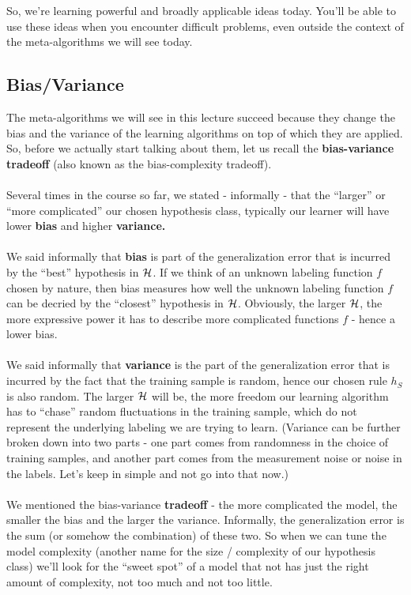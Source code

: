 %
So, we're learning powerful
and broadly applicable ideas today.
 You'll be able to use these ideas when you
encounter difficult problems, even outside the context of the meta-algorithms we
will see today.

\subsection{Bias/Variance}

The meta-algorithms we will see in this lecture succeed because they change the
bias and the variance of the learning algorithms on top of which they are
applied. 
So, before we actually start talking about them, let us recall the {\bf bias-variance tradeoff} (also known as
the bias-complexity tradeoff). 
\\~\\
Several times in the course so far, we stated - informally - that the ``larger''
or ``more complicated'' our chosen hypothesis class, typically 
our learner will have lower
{\bf bias}
 and higher {\bf variance.}
\\~\\
 We said informally that {\bf bias} is part of the generalization error that is 
 incurred by the ``best'' hypothesis in $\mathcal{H}$. If
 we think of an unknown labeling function $f$ chosen by nature, 
 then bias measures how well the unknown labeling function $f$ can be decried by the
 ``closest'' hypothesis in $\mathcal{H}$. Obviously, the larger $\mathcal{H}$, the more
 expressive power it has to describe more complicated functions $f$ - hence a
 lower bias.
\\~\\
 We said informally that {\bf variance} is the part of the generalization error that is
 incurred by the fact that the training sample is random, hence our chosen rule
 $h_S$ is also random. The larger $\mathcal{H}$ will be, the more freedom our learning
 algorithm has to ``chase'' random fluctuations in the training sample, which do
 not represent the underlying labeling we are trying to learn. (Variance can be
   further broken down into two parts - one part comes from randomness in
   the choice of training samples, and another part comes from the measurement
 noise or noise in the labels. Let's keep in simple and not go into that now.)
\\~\\
 We mentioned the bias-variance {\bf tradeoff} - the more complicated the model,
 the smaller the bias and the larger the variance. Informally, the
 generalization error is the sum (or somehow the combination) of these two. So
 when we can tune the model complexity (another name for the size / complexity
 of our hypothesis class) we'll look for the ``sweet spot'' of a model that not
 has just the right amount of complexity, not too much and not too little.

